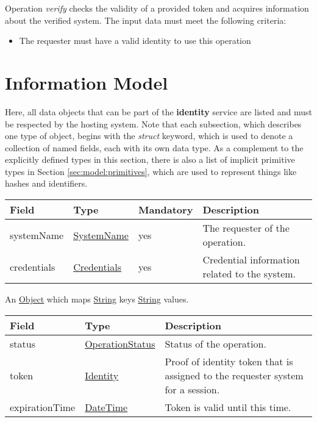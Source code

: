 \documentclass[a4paper]{arrowhead}
\newcommand{\pref}[1]{{\textcolor{ArrowheadGrey}{\hyperref[sec:model:primitives:#1]{#1}}}}
\begin{document}
Operation \textit{verify} checks the validity of a provided token and acquires information about the verified system. The input data must meet the following criteria:

\begin{itemize}
    \item The requester must have a valid identity to use this operation
\end{itemize}

\clearpage

\section{Information Model}
\label{sec:model}

Here, all data objects that can be part of the \textbf{identity} service are listed and must be respected by the hosting system.
Note that each subsection, which describes one type of object, begins with the \textit{struct} keyword, which is used to denote a collection of named fields, each with its own data type.
As a complement to the explicitly defined types in this section, there is also a list of implicit primitive types in Section \ref{sec:model:primitives}, which are used to represent things like hashes and identifiers.

{}
 
\begin{table}[ht!]
\begin{tabularx}{\textwidth}{| p{3cm} | p{3cm} | p{2cm} | X |} \hline
\rowcolor{gray!33} Field & Type & Mandatory & Description \\ \hline
systemName & \pref{SystemName} & yes & The requester of the operation. \\ \hline
credentials & \hyperref[sec:model:Credentials]{Credentials} & yes & Credential information related to the system. \\ \hline
\end{tabularx}
\end{table}


An \pref{Object} which maps \pref{String} keys  \pref{String} values.

 
\begin{table}[ht!]
\begin{tabularx}{\textwidth}{| p{4.25cm} | p{4cm} | X |} \hline
\rowcolor{gray!33} Field & Type      & Description \\ \hline
status & \pref{OperationStatus} & Status of the operation. \\ \hline
token & \hyperref[sec:model:Identity]{Identity} & Proof of identity token that is assigned to the requester system for a session. \\ \hline
expirationTime & \pref{DateTime} & Token is valid until this time. \\ \hline
\end{tabularx}
\end{table}
\end{document}
